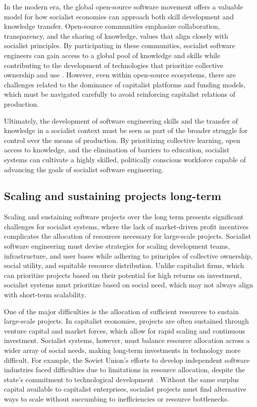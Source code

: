 \begin{refsection}
In the modern era, the global open-source software movement offers a valuable model for how socialist economies can approach both skill development and knowledge transfer. Open-source communities emphasize collaboration, transparency, and the sharing of knowledge, values that align closely with socialist principles. By participating in these communities, socialist software engineers can gain access to a global pool of knowledge and skills while contributing to the development of technologies that prioritize collective ownership and use \cite[pp.~33-35]{raymond}. However, even within open-source ecosystems, there are challenges related to the dominance of capitalist platforms and funding models, which must be navigated carefully to avoid reinforcing capitalist relations of production.

Ultimately, the development of software engineering skills and the transfer of knowledge in a socialist context must be seen as part of the broader struggle for control over the means of production. By prioritizing collective learning, open access to knowledge, and the elimination of barriers to education, socialist systems can cultivate a highly skilled, politically conscious workforce capable of advancing the goals of socialist software engineering.

\subsection{Scaling and sustaining projects long-term}

Scaling and sustaining software projects over the long term presents significant challenges for socialist systems, where the lack of market-driven profit incentives complicates the allocation of resources necessary for large-scale projects. Socialist software engineering must devise strategies for scaling development teams, infrastructure, and user bases while adhering to principles of collective ownership, social utility, and equitable resource distribution. Unlike capitalist firms, which can prioritize projects based on their potential for high returns on investment, socialist systems must prioritize based on social need, which may not always align with short-term scalability.

One of the major difficulties is the allocation of sufficient resources to sustain large-scale projects. In capitalist economies, projects are often sustained through venture capital and market forces, which allow for rapid scaling and continuous investment. Socialist systems, however, must balance resource allocation across a wider array of social needs, making long-term investments in technology more difficult. For example, the Soviet Union’s efforts to develop independent software industries faced difficulties due to limitations in resource allocation, despite the state’s commitment to technological development \cite[pp.~200-203]{nove1991}. Without the same surplus capital available to capitalist enterprises, socialist projects must find alternative ways to scale without succumbing to inefficiencies or resource bottlenecks.


\end{refsection}
